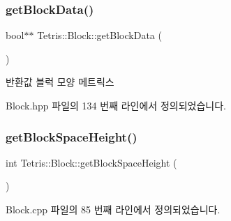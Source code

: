 \subsubsection{\texorpdfstring{get\+Block\+Data()}{getBlockData()}\hspace{0.1cm}{\footnotesize\ttfamily [2/2]}}
{\footnotesize\ttfamily bool$\ast$$\ast$ Tetris\+::\+Block\+::get\+Block\+Data (\begin{DoxyParamCaption}{ }\end{DoxyParamCaption})\hspace{0.3cm}{\ttfamily [inline]}}

\begin{DoxyReturn}{반환값}
블럭 모양 메트릭스 
\end{DoxyReturn}


Block.\+hpp 파일의 134 번째 라인에서 정의되었습니다.

\mbox{\label{class_tetris_1_1_block_a5301977e32c03aaf122fa289fcba77ba}} 
\subsubsection{\texorpdfstring{get\+Block\+Space\+Height()}{getBlockSpaceHeight()}\hspace{0.1cm}{\footnotesize\ttfamily [1/2]}}
{\footnotesize\ttfamily int Tetris\+::\+Block\+::get\+Block\+Space\+Height (\begin{DoxyParamCaption}{ }\end{DoxyParamCaption})}



Block.\+cpp 파일의 85 번째 라인에서 정의되었습니다.

